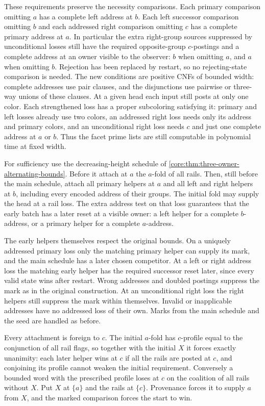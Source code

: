 These requirements preserve the necessity comparisons.
Each primary comparison omitting $a$ has a complete left
address at $b$. Each left successor comparison omitting $b$
and each addressed right comparison omitting $c$ has a
complete primary address at $a$. In particular the extra
right-group sources suppressed by unconditional losses
still have the required opposite-group $c$-postings and
a complete address at an owner visible to the observer:
$b$ when omitting $a$, and $a$ when omitting $b$. Rejection
has been replaced by restart, so no rejecting-state
comparison is needed. The new conditions are positive
CNFs of bounded width: complete addresses use pair clauses,
and the disjunctions use pairwise or three-way unions of
these clauses. At a given head each input still posts at
only one color. Each strengthened loss has a proper
subcoloring satisfying it: primary and left losses already
use two colors, an addressed right loss needs only its
address and primary colors, and an unconditional right
loss needs $c$ and just one complete address at $a$ or $b$.
Thus the facet prime lists are still computable in polynomial
time at fixed width.

For sufficiency use the decreasing-height schedule of
\cref{core:thm:three-owner-alternating-bounds}. Before it
attach at $a$ the $a$-fold of all rails. Then, still before
the main schedule, attach all primary helpers at $a$ and
all left and right helpers at $b$, including every encoded
address of their groups. The initial fold may supply the
head at a rail loss. The extra address test on that loss
guarantees that the early batch has a later reset at a
visible owner: a left helper for a complete $b$-address,
or a primary helper for a complete $a$-address.

The early helpers themselves respect the original bounds.
On a uniquely addressed primary loss only the matching
primary helper can supply its mark, and the main schedule
has a later chosen competitor. At a left or right address
loss the matching early helper has the required successor
reset later, since every valid state wins after restart.
Wrong addresses and doubled postings suppress the mark as
in the original construction. At an unconditional right
loss the right helpers still suppress the mark within
themselves. Invalid or inapplicable addresses have no
addressed loss of their own. Marks from the main schedule
and the seed are handled as before.

Every attachment is foreign to $c$. The initial $a$-fold
has $c$-profile equal to the conjunction of all rail flags,
so together with the initial $X$ it forces exactly unanimity:
each later helper wins at $c$ if all the rails are posted
at $c$, and conjoining its profile cannot weaken the initial
requirement. Conversely a bounded word with the prescribed
profile loses at $c$ on the coalition of all rails without
$X$. Put $X$ at $\{a\}$ and the rails at $\{c\}$. Provenance
forces it to supply $a$ from $X$, and the marked comparison
forces the start to win.


